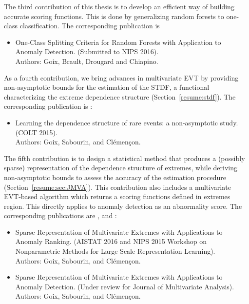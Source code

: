 
The third contribution of this thesis is to develop an efficient way of building accurate scoring functions. This is done by generalizing random forests to one-class classification. The corresponding publication is 
\begin{itemize}
\item One-Class Splitting Criteria for Random Forests with Application to Anomaly Detection. (Submitted to NIPS 2016).\\
Authors: Goix, Brault, Drougard and Chiapino.
\end{itemize}


As a fourth contribution, we bring advances in multivariate EVT by providing non-asymptotic bounds for the estimation of the STDF, a functional characterizing the extreme dependence structure (Section~\ref{resume:stdf}). The corresponding publication is \cite{COLT15}:
\begin{itemize}
\item Learning the dependence structure of rare events: a non-asymptotic study. (COLT 2015).\\
Authors: Goix, Sabourin, and Clémençon.
\end{itemize}

The fifth contribution is to design a statistical method that produces a (possibly sparse) representation of the dependence structure of extremes, while deriving non-asymptotic bounds to assess the accuracy of the estimation procedure (Section~\ref{resume:sec:JMVA}).
%
This contribution also includes a multivariate EVT-based algorithm which returns a scoring functions defined in extremes region. This directly applies to anomaly detection as an abnormality score.
The corresponding publications are \cite{AISTAT16}, \cite{NIPSWORKSHOP15} and \cite{ARXIV16}:
%
\begin{itemize}
\item Sparse Representation of Multivariate Extremes with Applications to Anomaly Ranking. (AISTAT 2016 and NIPS 2015 Workshop on Nonparametric Methods for Large Scale Representation Learning).\\
Authors: Goix, Sabourin, and Clémençon.
\item Sparse Representation of Multivariate Extremes with Applications to Anomaly Detection. (Under review for Journal of Multivariate Analysis).\\
Authors: Goix, Sabourin, and Clémençon.
\end{itemize}


